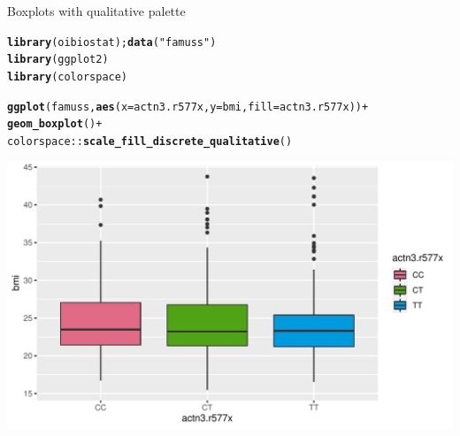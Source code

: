 \documentclass[10pt,handout]{beamer}\usepackage[]{graphicx}\usepackage[]{color}
\makeatletter
\def\maxwidth{ %
  \ifdim\Gin@nat@width>\linewidth
    \linewidth
  \else
    \Gin@nat@width
  \fi
}
\newcommand{\hlstr}[1]{\textcolor[rgb]{0.192,0.494,0.8}{#1}}%
\newcommand{\hlopt}[1]{\textcolor[rgb]{0,0,0}{#1}}%
\newcommand{\hlstd}[1]{\textcolor[rgb]{0.345,0.345,0.345}{#1}}%
\newcommand{\hlkwc}[1]{\textcolor[rgb]{0.333,0.667,0.333}{#1}}%
\newcommand{\hlkwd}[1]{\textcolor[rgb]{0.737,0.353,0.396}{\textbf{#1}}}%
\newenvironment{kframe}{%
 \def\at@end@of@kframe{}%
 \ifinner\ifhmode%
  \def\at@end@of@kframe{\end{minipage}}%
  \begin{minipage}{\columnwidth}%
 \fi\fi%
 \def\FrameCommand##1{\hskip\@totalleftmargin \hskip-\fboxsep
 \colorbox{shadecolor}{##1}\hskip-\fboxsep
     \hskip-\linewidth \hskip-\@totalleftmargin \hskip\columnwidth}%
 \MakeFramed {\advance\hsize-\width
   \@totalleftmargin\z@ \linewidth\hsize
   \@setminipage}}%
 {\par\unskip\endMakeFramed%
 \at@end@of@kframe}
\newenvironment{knitrout}{}{} %
\makeatother
\begin{document}
\begin{frame}[fragile]{Boxplots with qualitative palette}
\begin{knitrout}\tiny
{}\color{fgcolor}\begin{kframe}
\begin{alltt}
\hlkwd{library}\hlstd{(oibiostat);} \hlkwd{data}\hlstd{(}\hlstr{"famuss"}\hlstd{)}
\hlkwd{library}\hlstd{(ggplot2)}
\hlkwd{library}\hlstd{(colorspace)}

\hlkwd{ggplot}\hlstd{(famuss,} \hlkwd{aes}\hlstd{(}\hlkwc{x} \hlstd{= actn3.r577x,} \hlkwc{y} \hlstd{= bmi,} \hlkwc{fill} \hlstd{= actn3.r577x))} \hlopt{+}
\hlkwd{geom_boxplot}\hlstd{()} \hlopt{+}
\hlstd{colorspace}\hlopt{::}\hlkwd{scale_fill_discrete_qualitative}\hlstd{()}
\end{alltt}
\end{kframe}

{\centering \includegraphics[width=\maxwidth]{figure/unnamed-chunk-1-1} 

}



\end{knitrout}
\end{frame}
\end{document}
